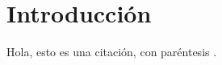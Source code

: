 \chapter*{Introducción}\label{chapter:introduction}

Hola, esto es una citación, con paréntesis \citep{GuanZhengyi2021}.
